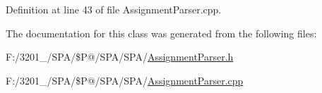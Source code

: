 Definition at line 43 of file Assignment\-Parser.\-cpp.



The documentation for this class was generated from the following files\-:\begin{DoxyCompactItemize}
\item 
F\-:/3201\-\_/\-S\-P\-A/\$\-P@/\-S\-P\-A/\-S\-P\-A/\hyperlink{_assignment_parser_8h}{Assignment\-Parser.\-h}\item 
F\-:/3201\-\_/\-S\-P\-A/\$\-P@/\-S\-P\-A/\-S\-P\-A/\hyperlink{_assignment_parser_8cpp}{Assignment\-Parser.\-cpp}\end{DoxyCompactItemize}
